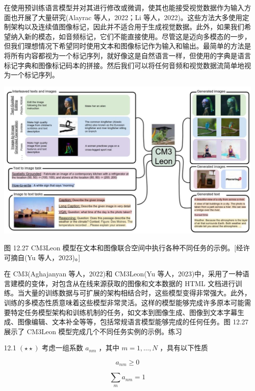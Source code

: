 \documentclass[10pt]{report}
\begin{document}
在使用预训练语言模型并对其进行修改或微调，使其也能接受视觉数据作为输入方面也开展了大量研究(Alayrac 等人，2022；Li 等人，2022)。这些方法大多使用定制架构以及连续值图像标记，因此并不适合用于生成视觉数据。此外，如果我们希望纳入新的模态，如音频标记，它们不能直接使用。尽管这是迈向多模态的一步，但我们理想情况下希望同时使用文本和图像标记作为输入和输出。最简单的方法是将所有内容都视为一个标记序列，就好像这是自然语言一样，但使用的字典是语言标记字典和图像标记码本的拼接。然后我们可以将任何音频和视觉数据流简单地视为一个标记序列。

\begin{center}
\includegraphics[max width=1.0\textwidth]{images/0194e279-9b28-703a-88f4-c3ac21e2010d_422_227_373_1335_797_0.jpg}
\end{center}
\hspace*{3em} 

图 12.27 CM3Leon 模型在文本和图像联合空间中执行各种不同任务的示例。[经许可摘自(Yu 等人，2023)。]

在 CM3(Aghajanyan 等人，2022)和 CM3Leon(Yu 等人，2023)中，采用了一种语言建模的变体，对包含从在线来源获取的图像和文本数据的 HTML 文档进行训练。当大量的训练数据与可扩展的架构相结合时，这些模型变得非常强大。此外，训练的多模态性质意味着这些模型非常灵活。这样的模型能够完成许多原本可能需要特定任务模型架构和训练机制的任务，如文本到图像生成、图像到文本字幕生成、图像编辑、文本补全等等，包括常规语言模型能够完成的任何任务。图 12.27 展示了 CM3Leon 模型完成几个不同任务实例的示例。练习

12.1 \(\left( {\star  \star  }\right)\) 考虑一组系数 \({a}_{nm}\) ，其中 \(m = 1,\ldots ,N\) ，具有以下性质

\[
{a}_{nm} \geq  0 \tag{12.39}
\]

\[
\mathop{\sum }\limits_{m}{a}_{nm} = 1 \tag{12.40}
\]
\end{document}
